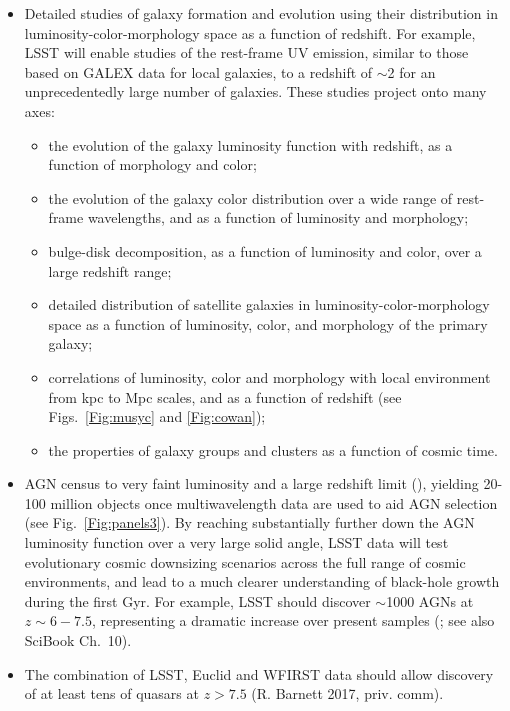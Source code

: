 \begin{itemize}
\item Detailed studies of galaxy formation and evolution using their distribution in
luminosity-color-morphology space as a function of redshift. For example, LSST will
enable studies of the rest-frame UV emission, similar to those based on GALEX data
for local galaxies, to a redshift of $\sim$2 for an unprecedentedly large number of
galaxies. These studies project onto many axes:
\begin{itemize}
  \item the evolution of the galaxy luminosity function with redshift, as a function of
        morphology and color;
  \item the evolution of the galaxy color distribution over a wide range of rest-frame
        wavelengths, and as a function of luminosity and morphology;
  \item bulge-disk decomposition, as a function of luminosity and color, over
        a large redshift range;
  \item detailed distribution of satellite galaxies in luminosity-color-morphology space
        as a function of luminosity, color, and morphology of the primary galaxy;
  \item correlations of luminosity, color and morphology with local environment from
           kpc to Mpc scales, and as a function of redshift (see  Figs.~\ref{Fig:musyc} and \ref{Fig:cowan});
  \item the properties of galaxy groups and clusters as a function of cosmic time.
\end{itemize}
\item AGN census to very faint luminosity and a large redshift limit
  (\cite{Ivezic2013}), yielding 20-100 million objects once multiwavelength
      data are used to aid AGN selection (see Fig.~\ref{Fig:panels3}). By reaching substantially further
      down the AGN luminosity function over a very large solid angle, LSST data
      will test evolutionary cosmic downsizing scenarios across the full range of cosmic environments,
      and lead to a much clearer understanding of black-hole growth during the first Gyr. For
      example, LSST should discover $\sim$1000 AGNs at $z\sim6-7.5$,
      representing a dramatic increase over present samples
      (\cite{Brandt2007}; see also SciBook Ch.~10).
\item The combination of LSST, Euclid and WFIRST data should allow discovery of at least
       tens of quasars at $z>7.5$ (R. Barnett 2017, priv. comm).

\end{itemize}
